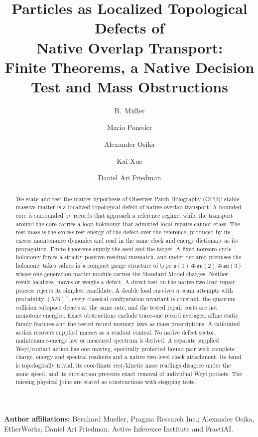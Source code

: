 \documentclass[11pt]{article}
\title{Particles as Localized Topological Defects of\\
Native Overlap Transport:\\
Finite Theorems, a Native Decision Test and Mass Obstructions}
\author{B.\ M\"uller \and Mario Poneder \and Alexander Osika \and Kai Xue \and Daniel Ari Friedman}
\date{\OPHPaperReleaseDate}
\begin{document}
\maketitle
\OPHPaperReleaseBanner

\begin{center}
\small\textbf{Author affiliations:} Bernhard Mueller, Pragma Research Inc.; Alexander Osika, EtherWorks; Daniel Ari Friedman, Active Inference Institute and FractiAI.
\end{center}

\begin{abstract}
We state and test the matter hypothesis of Observer Patch Holography (OPH):
stable massive matter is a localized topological defect of native overlap
transport. A bounded core is surrounded by records that approach a reference
regime, while the transport around the core carries a loop holonomy that
admitted local repairs cannot erase. The rest mass is the excess rest energy
of the defect over the reference, produced by its excess maintenance
dynamics and read in the same clock and energy dictionary as its propagation.
Finite theorems supply the seed and the target. A fixed nonzero cycle
holonomy forces a strictly positive residual mismatch, and under declared
premises the holonomy takes values in a compact gauge structure of type
\(\mathfrak u(1)\oplus\mathfrak{su}(2)\oplus\mathfrak{su}(3)\) whose
one-generation matter module carries the Standard Model charges. Neither
result localizes, moves or weighs a defect. A direct test on the native
two-load repair process rejects its simplest candidate. A double load
survives \(n\) seam attempts with probability \((5/6)^n\), every classical
configuration invariant is constant, the quantum collision subspace decays
at the same rate, and the tested repair costs are not monotone energies.
Exact obstructions exclude trace-one record averages, affine static family
features and the tested record-memory laws as mass prescriptions. A
calibrated action recovers supplied masses as a readout control. No native
defect sector, maintenance-energy law or measured spectrum is derived.
A separate supplied Weyl/contact action has one moving, spectrally
protected bound pair with complete charge, energy and spectral readouts
and a native two-level clock attachment. Its band is topologically trivial,
its coordinate rest/kinetic mass readings disagree under the same speed,
and its interaction prevents exact removal of individual Weyl pockets.
The missing physical joins are stated as constructions with stopping tests.
\end{abstract}
\end{document}
